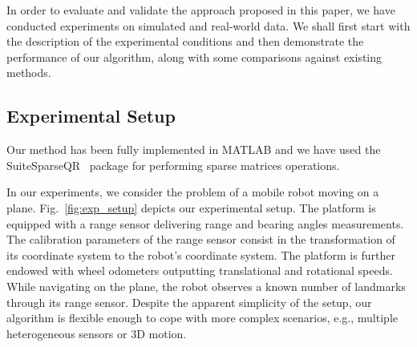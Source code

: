 In order to evaluate and validate the approach proposed in this paper, we have
conducted experiments on simulated and real-world data. We shall first start
with the description of the experimental conditions and then demonstrate the
performance of our algorithm, along with some comparisons against existing
methods.

\subsection{Experimental Setup}

Our method has been fully implemented in MATLAB and we have used the
SuiteSparseQR~\cite{davis11algorithm} package for performing sparse matrices
operations.

In our experiments, we consider the problem of a mobile robot moving on a plane.
Fig.~\ref{fig:exp_setup} depicts our experimental setup. The platform is
equipped with a range sensor delivering range and bearing angles measurements.
The calibration parameters of the range sensor consist in the transformation of
its coordinate system to the robot's coordinate system. The platform is further
endowed with wheel odometers outputting translational and rotational speeds.
While navigating on the plane, the robot observes a known number of landmarks
through its range sensor. Despite the apparent simplicity of the setup, our
algorithm is flexible enough to cope with more complex scenarios, e.g., multiple
heterogeneous sensors or 3D motion.

